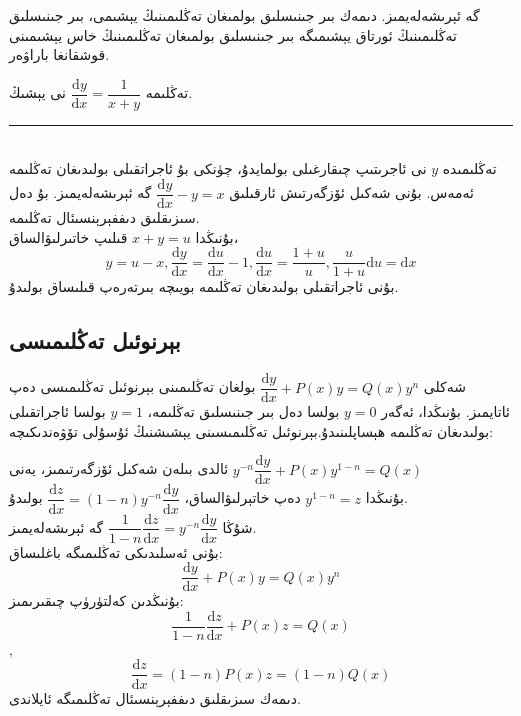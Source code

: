 گە ئېرىشەلەيمىز. دىمەك بىر جىنىسلىق بولمىغان تەڭلىمىنىڭ يېشىمى، بىر جىنىسلىق تەڭلىمىنىڭ ئورتاق يېشىمىگە بىر جىنىسلىق بولمىغان تەڭلىمىنىڭ خاس يېشىمىنى قوشقانغا باراۋەر.

\begin{myexample}
	تەڭلىمە
	$\dfrac{\textrm{d}y}{\textrm{d}x}=\dfrac{1}{x+y}$
	نى يېشىڭ.
	\\\rule{\linewidth}{0.05em}\\
	تەڭلىمىدە $y$ نى ئاجرىتىپ چىقارغىلى بولمايدۇ، چۈنكى بۇ ئاجراتقىلى بولىدىغان تەڭلىمە ئەمەس. بۇنى شەكىل ئۆزگەرتىش ئارقىلىق
	$\dfrac{\textrm{d}y}{\textrm{d}x}-y=x$
	گە ئېرىشەلەيمىز. بۇ دەل سىزىقلىق دىففېرېنسىئال تەڭلىمە.\\
	بۇنىڭدا $x+y=u$ قىلىپ خاتىرلىۋالساق،
$$y=u-x, \dfrac{\textrm{d}y}{\textrm{d}x}=\dfrac{\textrm{d}u}{\textrm{d}x}-1, \dfrac{\textrm{d}u}{\textrm{d}x}=\dfrac{1+u}{u}, \dfrac{u}{1+u}\textrm{d}u=\textrm{d}x$$
بۇنى ئاجراتقىلى بولىدىغان تەڭلىمە بويىچە بىرتەرەپ قىلىساق بولىدۇ.
\end{myexample}

\subsection{بېرنوئىل تەڭلىمىسى}
شەكلى
$\dfrac{\textrm{d}y}{\textrm{d}x}+P(x)y=Q(x)y^n$
بولغان تەڭلىمىنى بېرنوئىل تەڭلىمىسى دەپ ئاتايمىز. بۇنىڭدا، ئەگەر $y=0$ بولسا دەل بىر جىنىسلىق تەڭلىمە، $y=1$ بولسا ئاجراتقىلى بولىدىغان تەڭلىمە ھېساپلىنىدۇ.بېرنوئىل تەڭلىمىسىنى يېشىشنىڭ ئۇسۇلى تۆۋەندىكىچە:
\begin{colorful}[cyan]
ئالدى بىلەن شەكىل ئۆزگەرتىمىز، يەنى 
$y^{-n}\dfrac{\textrm{d}y}{\textrm{d}x}+P(x)y^{1-n}=Q(x)$\\
بۇنىڭدا
$y^{1-n}=z$
دەپ خاتېرلىۋالساق،
$\dfrac{\textrm{d}z}{\textrm{d}x}=(1-n)y^{-n}\dfrac{\textrm{d}y}{\textrm{d}x}$
بولىدۇ.\\
شۇڭا 
$\dfrac{1}{1-n}\dfrac{\textrm{d}z}{\textrm{d}x}=y^{-n}\dfrac{\textrm{d}y}{\textrm{d}x}$
گە ئېرىشەلەيمىز.\\
بۇنى ئەسلىدىكى تەڭلىمىگە باغلىساق: 
$$\dfrac{\textrm{d}y}{\textrm{d}x}+P(x)y=Q(x)y^n$$
بۇنىڭدىن كەلتۈرۈپ چىقىرىمىز:
$$\dfrac{1}{1-n}\dfrac{\textrm{d}z}{\textrm{d}x}+P(x)z=Q(x)$$,
$$\dfrac{\textrm{d}z}{\textrm{d}x}=(1-n)P(x)z=(1-n)Q(x)$$
دىمەك سىزىقلىق دىففېرېنسىئال تەڭلىمىگە ئايلاندى.
\end{colorful}

